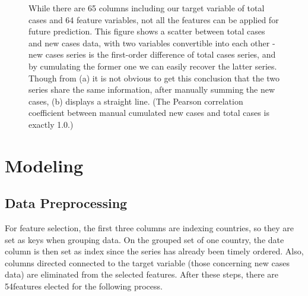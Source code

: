 \documentclass[12pt]{article}
\begin{document}
\begin{figure}[htb]
	\centering
	\caption{While there are 65 columns including our target variable of total cases and 64 feature variables, not all the features can be applied for future prediction. This figure shows a scatter between total cases and new cases data, with two variables convertible into each other - new cases series is the first-order difference of total cases series, and by cumulating the former one we can easily recover the latter series. Though from (a) it is not obvious to get this conclusion that the two series share the same information, after manually summing the new cases, (b) displays a straight line. (The Pearson correlation coefficient between manual cumulated new cases and total cases is exactly 1.0.)}
\end{figure}

\section{Modeling}
\subsection{Data Preprocessing}
For feature selection, the first three columns are indexing countries, so they are set as keys when grouping data. On the grouped set of one country, the date column is then set as index since the series has already been timely ordered. Also, columns directed connected to the target variable (those concerning new cases data) are eliminated from the selected features. After these steps, there are 54features elected for the following process.\\
\end{document}
